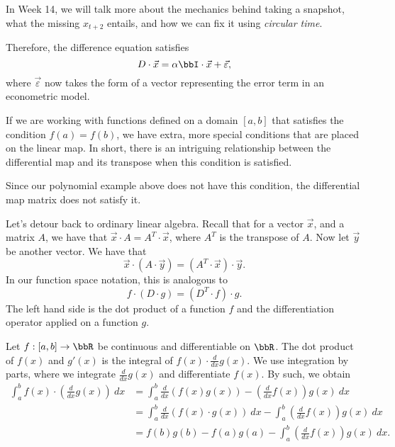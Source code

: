 \documentclass[a4paper, 12pt,oneside,openany]{book}
\begin{document}
{In Week 14, we will talk more about the mechanics behind taking a snapshot, what the missing $x_{t+2}$ entails, and how we can fix it using \emph{circular time}.

Therefore, the difference equation satisfies $$D\cdot \vec{x} = \alpha \bbI \cdot \vec{x} + \vec{\varepsilon},$$ where $\vec{\varepsilon}$ now takes the form of a vector representing the error term in an econometric model.

}

If we are working with functions defined on a domain $[a, b]$ that satisfies the condition $f(a)=f(b)$, we have extra, more special conditions that are placed on the linear map. In short, there is an intriguing relationship between the differential map and its transpose when this condition is satisfied. 

Since our polynomial example above does not have this condition, the differential map matrix does not satisfy it. 

Let's detour back to ordinary linear algebra. Recall that for a vector $\vec{x}$, and a matrix $A$, we have that $\vec{x} \cdot A = A^T \cdot \vec{x}$, where $A^T$ is the transpose of $A$. Now let $\vec{y}$ be another vector. We have that $$\vec{x} \cdot (A \cdot \vec{y}) = (A^T \cdot \vec{x}) \cdot \vec{y}.$$ In our function space notation, this is analogous to \begin{equation}f \cdot (D \cdot g) = (D^T \cdot f) \cdot g.\end{equation} The left hand side is the dot product of a function $f$ and the differentiation operator applied on a function $g$.

Let $f: [a,b]\to \bbR$ be continuous and differentiable on $\bbR$. The dot product of $f(x)$ and $g'(x)$ is the integral of $f(x)\cdot \frac{d}{dx} g(x)$. We use integration by parts, where we integrate $\frac{d}{dx} g(x)$ and differentiate $f(x)$. By such, we obtain \begin{align*} \int_a^b f(x) \cdot \left(\frac{d}{dx} g(x)\right) \ dx  &= \int_a^b \frac{d}{dx} \left(f(x)g(x)\right) - \left(\frac{d}{dx} f(x)\right) g(x)\ dx \\ &= \int_a^b \frac{d}{dx} (f(x)\cdot g(x)) \ dx - \int_a^b \left(\frac{d}{dx} f(x)\right) g(x)\ dx \\ &= f(b)g(b)-f(a)g(a) - \int_a^b \left(\frac{d}{dx} f(x)\right) g(x)\ dx.\end{align*}
\end{document}
